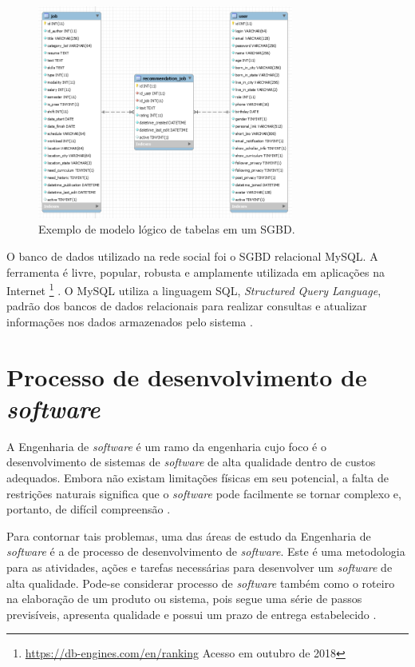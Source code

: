 \begin{figure}[h]
    \caption{Exemplo de modelo lógico de tabelas em um SGBD.}
       	\begin{center}
            \includegraphics[width=0.75\textwidth]{figuras/er-exemplo.png}
        \end{center}
    \label{modelagemBDLogicoExemplol}
\end{figure}

O banco de dados utilizado na rede social foi o SGBD relacional MySQL. A ferramenta é livre, popular, robusta e amplamente utilizada em aplicações na Internet \footnote{\url{https://db-engines.com/en/ranking} Acesso em outubro de 2018} \cite{mysql}. O MySQL utiliza a linguagem SQL, \textit{Structured Query Language}, padrão dos bancos de dados relacionais para realizar consultas e atualizar informações nos dados armazenados pelo sistema \cite{sqlCompleteBook}.

\section{Processo de desenvolvimento de \textit{software}}

A Engenharia de \textit{software} é um ramo da engenharia cujo foco é o desenvolvimento de sistemas de \textit{software} de alta qualidade dentro de custos adequados. Embora não existam limitações físicas em seu potencial, a falta de restrições naturais significa que o \textit{software} pode facilmente se tornar complexo e, portanto, de difícil compreensão \cite{sommerville}.

Para contornar tais problemas, uma das áreas de estudo da Engenharia de \textit{software} é a de processo de desenvolvimento de \textit{software}. Este é uma metodologia para as atividades, ações e tarefas necessárias para desenvolver um \textit{software} de alta qualidade. Pode-se considerar processo de \textit{software} também como o roteiro na elaboração de um produto ou sistema, pois segue uma série de passos previsíveis, apresenta qualidade e possui um prazo de entrega estabelecido \cite{pressman}.


